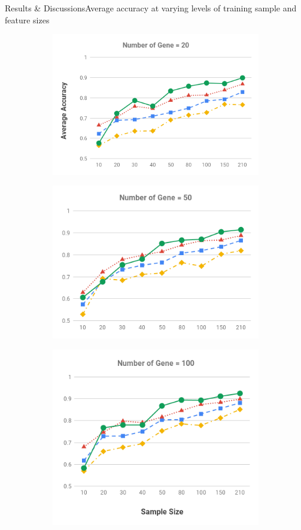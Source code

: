 \documentclass[xcolor=table]{beamer}
\numberwithin{figure}{section}
\numberwithin{equation}{section}
\begin{document}
\begin{frame}{Results \& Discussions}{Average accuracy at varying levels of training sample and feature sizes}
\begin{figure}
\begin{subfigure}
  \centering
  \includegraphics[scale=0.18,valign=t]{pictures/NumberofGene=20.png}
\end{subfigure}
\begin{subfigure}
  \centering
  \includegraphics[scale=0.18,valign=t]{pictures/NumberofGene=50.png}
\end{subfigure}
\begin{subfigure}
  \centering
  \includegraphics[scale=0.18,valign=t]{pictures/NumberofGene=100.png}

\end{subfigure}
\end{figure}
\end{frame}
\end{document}
